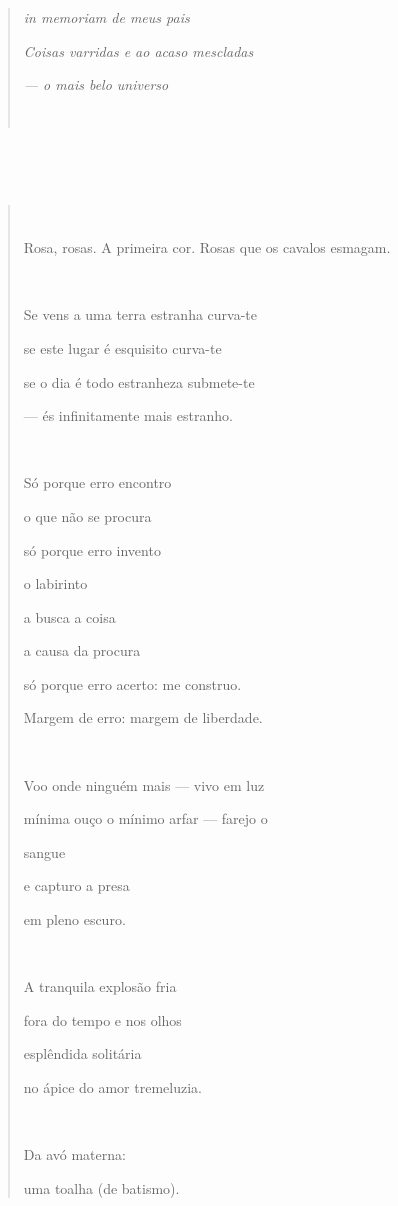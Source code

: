 \begin{quote}
\emph{in memoriam de meus pais}

\emph{Coisas varridas e ao acaso mescladas}

\emph{--- o mais belo universo}


\end{quote}

\subsection{}\label{section-4}

\begin{quote}


Rosa, rosas. A primeira cor. Rosas que os cavalos esmagam.



Se vens a uma terra estranha curva-te

se este lugar é esquisito curva-te

se o dia é todo estranheza submete-te

--- és infinitamente mais estranho.



Só porque erro encontro

o que não se procura

só porque erro invento

o labirinto

a busca a coisa

a causa da procura

só porque erro acerto: me construo.

Margem de erro: margem de liberdade.



Voo onde ninguém mais --- vivo em luz

mínima ouço o mínimo arfar --- farejo o

sangue

e capturo a presa

em pleno escuro.



A tranquila explosão fria

fora do tempo e nos olhos

esplêndida solitária

no ápice do amor tremeluzia.



Da avó materna:

uma toalha (de batismo).


\end{quote}
